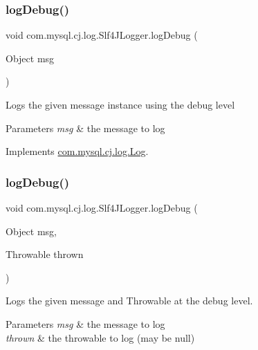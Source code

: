 \subsubsection{\texorpdfstring{log\+Debug()}{logDebug()}\hspace{0.1cm}{\footnotesize\ttfamily [1/2]}}
{\footnotesize\ttfamily void com.\+mysql.\+cj.\+log.\+Slf4\+J\+Logger.\+log\+Debug (\begin{DoxyParamCaption}\item[{Object}]{msg }\end{DoxyParamCaption})}

Logs the given message instance using the \textquotesingle{}debug\textquotesingle{} level


\begin{DoxyParams}{Parameters}
{\em msg} & the message to log \\
\hline
\end{DoxyParams}


Implements \mbox{\hyperlink{interfacecom_1_1mysql_1_1cj_1_1log_1_1_log_a6149f715730ea0615ef6e341dd3e8a39}{com.\+mysql.\+cj.\+log.\+Log}}.

\mbox{\label{classcom_1_1mysql_1_1cj_1_1log_1_1_slf4_j_logger_aeaf3ce8432b63f1b631e7ad698ea7aa6}} 
\subsubsection{\texorpdfstring{log\+Debug()}{logDebug()}\hspace{0.1cm}{\footnotesize\ttfamily [2/2]}}
{\footnotesize\ttfamily void com.\+mysql.\+cj.\+log.\+Slf4\+J\+Logger.\+log\+Debug (\begin{DoxyParamCaption}\item[{Object}]{msg,  }\item[{Throwable}]{thrown }\end{DoxyParamCaption})}

Logs the given message and Throwable at the \textquotesingle{}debug\textquotesingle{} level.


\begin{DoxyParams}{Parameters}
{\em msg} & the message to log \\
\hline
{\em thrown} & the throwable to log (may be null) \\
\hline
\end{DoxyParams}


